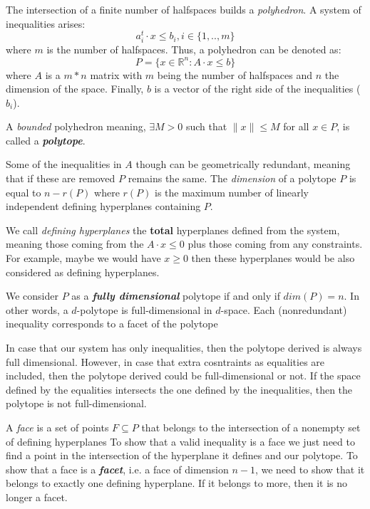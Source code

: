    The intersection of a finite number of halfspaces builds a \textit{polyhedron}.
   A system of inequalities arises:
   \begin{equation}
      a_{i}^{t} \cdot x \leq b_{i},  i \in \{1, .., m\}      
   \end{equation} 
   where $m$ is the number of halfspaces. 
   Thus, a polyhedron can be denoted as:
   \begin{equation}
      P = \{ x \in \mathbb{R}^n : A \cdot x \leq b \}
   \end{equation}
   where $A$ is a $m*n$ matrix
   with $m$ being the number of halfspaces 
   and $n$ the dimension of the space. 
   Finally, $b$ is a vector of the right side of the inequalities ($b_{i}$).
   
   A \textit{bounded} polyhedron meaning, 
   $ \exists M > 0$ such that $\|x\| \leq M$ for all $x \in P$,
   is called a \textit{\textbf{polytope}}.
   
   Some of the inequalities in $A$ though can be geometrically redundant,
   meaning that if these are removed $P$ remains the same. 
   The \textit{dimension} of a polytope $P$ is equal to $n - r(P)$
   where $r(P)$ is the maximum number of linearly independent 
   defining hyperplanes containing $P$.

   We call \textit{defining hyperplanes} the \textbf{total}
   hyperplanes defined from the system, meaning 
   those coming from the $A \cdot x \leq 0$ 
   plus those coming from any constraints. 
   For example, maybe we would have $x \geq 0$ then these hyperplanes would be also considered
   as defining hyperplanes.

   We consider $P$ as a \textit{\textbf{fully dimensional}} polytope
   if and only if $dim(P) = n$.
   In other words, 
   a $d$-polytope is full-dimensional in $d$-space.
   Each (nonredundant) inequality corresponds to a facet of the polytope

   In case that our system has only inequalities, 
   then the polytope derived is always full dimensional.
   However, in case that extra cosntraints as equalities
   are included, then the polytope derived could be 
   full-dimensional or not. 
   If the space defined by the equalities intersects the one 
   defined by the inequalities, then the polytope is not full-dimensional.

   
   A \textit{face} is a set of points $ F \subseteq P$ that belongs 
   to the intersection of a nonempty set of defining hyperplanes 
   To show that a valid inequality is a face we just need to 
   find a point in the intersection of the hyperplane it defines
   and our polytope. 
   To show that a face is a \textit{\textbf{facet}}, 
   i.e. a face of dimension $n -1$,
   we need to show that it belongs to exactly one defining hyperplane.
   If it belongs to more, then it is no longer a facet.

